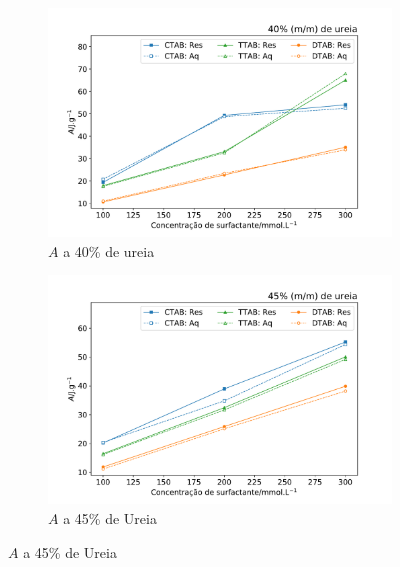 \begin{figure}[H]
	 	\begin{subfigure}[t]{0.45\textwidth}
	 		\includegraphics[width=\textwidth]{./imagens/dsc/A_40p_1_300_aq_res}
	 		\caption{$A$ a 40\% de ureia}
	 		\label{fig:DSC_A_40pUr}
	 	\end{subfigure} \qquad %
	 	\begin{subfigure}[t]{0.45\textwidth}
	 		\includegraphics[width=\textwidth]{./imagens/dsc/A_45p_1_300_aq_res}
	 		\caption{$A$ a 45\% de Ureia}
	 		\label{fig:DSC_A_45pUr}
	 	\end{subfigure}
 	

\end{figure}
